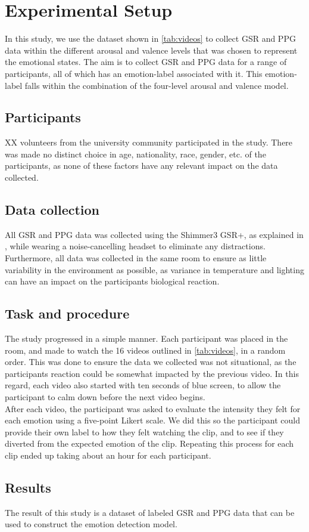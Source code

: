 \section{Experimental Setup}
In this study, we use the dataset shown in \cref{tab:videos} to collect GSR and PPG data within the different arousal and valence levels that was chosen to represent the emotional states. The aim is to collect GSR and PPG data for a range of participants, all of which has an emotion-label associated with it. This emotion-label falls within the combination of the four-level arousal and valence model.
\subsection{Participants}
XX volunteers from the university community participated in the study. There was made no distinct choice in age, nationality, race, gender, etc. of the participants, as none of these factors have any relevant impact on the data collected.    
\subsection{Data collection}
All GSR and PPG data was collected using the Shimmer3 GSR+, as explained in , while wearing a noise-cancelling headset to eliminate any distractions.
Furthermore, all data was collected in the same room to ensure as little variability in the environment as possible, as variance in temperature and lighting can have an impact on the participants biological reaction.
\subsection{Task and procedure}
The study progressed in a simple manner. Each participant was placed in the room, and made to watch the 16 videos outlined in \cref{tab:videos}, in a random order. This was done to ensure the data we collected was not situational, as the participants reaction could be somewhat impacted by the previous video. In this regard, each video also started with ten seconds of blue screen, to allow the participant to calm down before the next video begins.\\
After each video, the participant was asked to evaluate the intensity they felt for each emotion using a five-point Likert scale. We did this so the participant could provide their own label to how they felt watching the clip, and to see if they diverted from the expected emotion of the clip. Repeating this process for each clip ended up taking about an hour for each participant.
\subsection{Results}
The result of this study is a dataset of labeled GSR and PPG data that can be used to construct the emotion detection model.